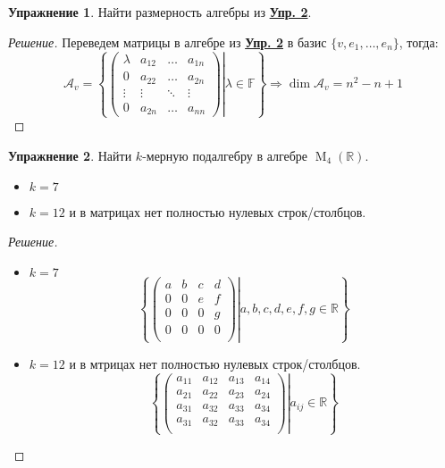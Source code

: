 \documentclass[a4paper, 14pt]{extarticle}
\theoremstyle{definition}
\newtheorem{exec}{Упражнение}
\begin{document}
\begin{exec}
	Найти размерность алгебры из \hyperref[ex1_2]{\textbf{Упр. 2}}.
\end{exec}

\begin{proof}[Решение]
	Переведем матрицы в алгебре из \hyperref[ex1_2]{\textbf{Упр. 2}} в базис \(\{v, e_1, \dots, e_n\}\), тогда:
	\[\mathcal{A}_v = \left\{
		\left(
			\left. 
				\begin{array}{cccc}
					\lambda&a_{12}&\hdots&a_{1n}\\
					0&a_{22}&\hdots&a_{2n}\\
					\vdots&\vdots&\ddots&\vdots\\
					0&a_{2n}&\hdots&a_{nn}
				\end{array}
			 \right) \right| \lambda \in \mathbb{F}
	\right\} \Rightarrow \operatorname{dim} \mathcal{A}_v = n^2 - n + 1\]
\end{proof}

\begin{exec}
	Найти \(k\)-мерную подалгебру в алгебре \(\operatorname{M}_4(\mathbb{R})\).
	\begin{itemize}
		\item \(k = 7\)
		\item \(k = 12\) и в матрицах нет полностью нулевых строк/столбцов.
	\end{itemize}
\end{exec}

\begin{proof}[Решение]
	\leavevmode
	\begin{itemize}
		\item \(k = 7\)
		\[\left\{
		\left(
		\left. \begin{array}{cccc}
			a&b&c&d\\
			0&0&e&f\\
			0&0&0&g\\
			0&0&0&0\\
		\end{array}
		\right) \right| a, b, c, d, e, f, g \in \mathbb{R}
		\right\}\]
		
		\item \(k = 12\) и в мтрицах нет полностью нулевых строк/столбцов.
			\[\left\{
		\left(
		\left. \begin{array}{cccc}
			a_{11}&a_{12}&a_{13}&a_{14}\\
			a_{21}&a_{22}&a_{23}&a_{24}\\
			a_{31}&a_{32}&a_{33}&a_{34}\\
			a_{31}&a_{32}&a_{33}&a_{34}\\
		\end{array}
		\right) \right| a_{ij} \in \mathbb{R}
		\right\}\]
	\end{itemize}
\end{proof}
\end{document}
